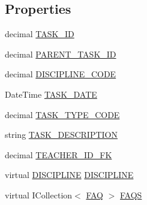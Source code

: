 \subsection*{Properties}
\begin{DoxyCompactItemize}
\item 
decimal \hyperlink{class_e_f_oracle_1_1_model_1_1_t_a_s_k_ab223e8757ed2301651774fca39a98400}{T\+A\+S\+K\+\_\+\+ID}
\item 
decimal \hyperlink{class_e_f_oracle_1_1_model_1_1_t_a_s_k_a5ac9a488859493a08a5444329e753286}{P\+A\+R\+E\+N\+T\+\_\+\+T\+A\+S\+K\+\_\+\+ID}
\item 
decimal \hyperlink{class_e_f_oracle_1_1_model_1_1_t_a_s_k_ac9131e2df43a2dfec7b0e70842e75d74}{D\+I\+S\+C\+I\+P\+L\+I\+N\+E\+\_\+\+C\+O\+DE}
\item 
Date\+Time \hyperlink{class_e_f_oracle_1_1_model_1_1_t_a_s_k_af516bc7f5d7d57602fc075c83b32bbc3}{T\+A\+S\+K\+\_\+\+D\+A\+TE}
\item 
decimal \hyperlink{class_e_f_oracle_1_1_model_1_1_t_a_s_k_adb154123cd9e2bc0261dc87c8c21834d}{T\+A\+S\+K\+\_\+\+T\+Y\+P\+E\+\_\+\+C\+O\+DE}
\item 
string \hyperlink{class_e_f_oracle_1_1_model_1_1_t_a_s_k_aae6ad0b9617c9463fb7fe62013a9a62b}{T\+A\+S\+K\+\_\+\+D\+E\+S\+C\+R\+I\+P\+T\+I\+ON}
\item 
decimal \hyperlink{class_e_f_oracle_1_1_model_1_1_t_a_s_k_a4bcadad5cfabc1190ecf0e156f329111}{T\+E\+A\+C\+H\+E\+R\+\_\+\+I\+D\+\_\+\+FK}
\item 
virtual \hyperlink{class_e_f_oracle_1_1_model_1_1_d_i_s_c_i_p_l_i_n_e}{D\+I\+S\+C\+I\+P\+L\+I\+NE} \hyperlink{class_e_f_oracle_1_1_model_1_1_t_a_s_k_a66e25370ae5bef6c0300656290cc0b30}{D\+I\+S\+C\+I\+P\+L\+I\+NE}
\item 
virtual I\+Collection$<$ \hyperlink{class_e_f_oracle_1_1_model_1_1_f_a_q}{F\+AQ} $>$ \hyperlink{class_e_f_oracle_1_1_model_1_1_t_a_s_k_ad46fc2e6a8218641cba78a2f7e30b148}{F\+A\+QS}

\end{DoxyCompactItemize}

